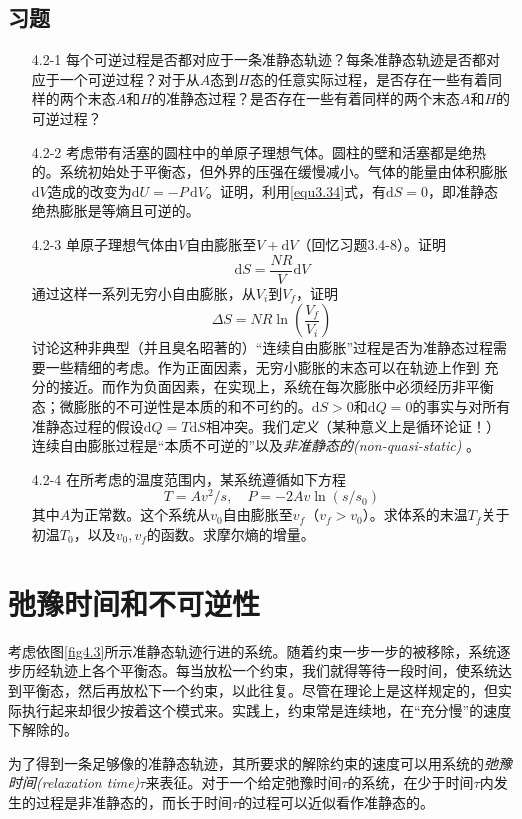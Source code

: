 \subsection*{习题}
\begin{itemize}
\item[4.2-1] 每个可逆过程是否都对应于一条准静态轨迹？每条准静态轨迹是否都对应于一个可逆过程？对于从$A$态到$H$态的任意实际过程，是否存在一些有着同样的两个末态$A$和$H$的准静态过程？是否存在一些有着同样的两个末态$A$和$H$的可逆过程？
\item[4.2-2] 考虑带有活塞的圆柱中的单原子理想气体。圆柱的壁和活塞都是绝热的。系统初始处于平衡态，但外界的压强在缓慢减小。气体的能量由体积膨胀$\mathrm dV$造成的改变为$\mathrm dU=-P\,\mathrm dV$。证明，利用\eqref{equ3.34}式，有$\mathrm dS=0$，即准静态绝热膨胀是等熵且可逆的。
\item[4.2-3] 单原子理想气体由$V$自由膨胀至$V+\mathrm dV$（回忆习题3.4-8）。证明
\[
\mathrm dS = \frac{NR}{V}\mathrm dV
\]
通过这样一系列无穷小自由膨胀，从$V_i$到$V_f$，证明
\[
\Delta S = NR\ln(\frac{V_f}{V_i})
\]
讨论这种非典型（并且臭名昭著的）“连续自由膨胀”过程是否为准静态过程需要一些精细的考虑。作为正面因素，无穷小膨胀的末态可以在轨迹上作到%
%
充分的接近。而作为负面因素，在实现上，系统在每次膨胀中必须经历非平衡态；微膨胀的不可逆性是本质的和不可约的。$\mathrm dS>0$和$\mathrm dQ=0$的事实与对所有准静态过程的假设$\mathrm dQ=T\mathrm dS$相冲突。我们{\it 定义}（某种意义上是循环论证！）连续自由膨胀过程是“本质不可逆的”以及{\it 非准静态的(non-quasi-static)}%
。
\item[4.2-4] 在所考虑的温度范围内，某系统遵循如下方程
\[
T=Av^2/s, \quad P=-2Av\ln(s/s_0)
\]
其中$A$为正常数。这个系统从$v_0$自由膨胀至$v_f$（$v_f>v_0$）。求体系的末温$T_f$关于初温$T_0$，以及$v_0,v_f$的函数。求摩尔熵的增量。
\end{itemize}

\section{弛豫时间和不可逆性}\label{sec4.3}
考虑依图\ref{fig4.3}所示准静态轨迹行进的系统。随着约束一步一步的被移除，系统逐步历经轨迹上各个平衡态。每当放松一个约束，我们就得等待一段时间，使系统达到平衡态，然后再放松下一个约束，以此往复。尽管在理论上是这样规定的，但实际执行起来却很少按着这个模式来。实践上，约束常是连续地，在“充分慢”的速度下解除的。

为了得到一条足够像的准静态轨迹，其所要求的解除约束的速度可以用系统的{\it 弛豫时间(relaxation time)}$\tau$来表征。对于一个给定弛豫时间$\tau$的系统，在少于时间$\tau$内发生的过程是非准静态的，而长于时间$\tau$的过程可以近似看作准静态的。


